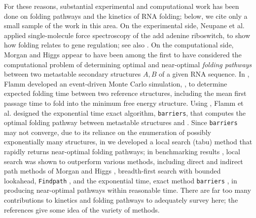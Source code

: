 For these reasons, substantial experimental and computational work
has been done on folding pathways and the kinetics of RNA folding;
below, we cite only a small sample of the work in this area.
On the experimental side,
Neupane et al. \cite{Neupane.nar11} applied single-molecule force spectroscopy
of the add adenine riboswitch, to show how folding  relates to
gene regulation;
see also \cite{Woodside.cocb08,Baird.jacs10,Mitra.r11}.
%
On the computational side, Morgan and Higgs \cite{morganHiggsBarrier}
appear to have been among the first
to have considered the computational problem of determining optimal and
near-optimal {\em folding pathways} between two metastable secondary
structures $A,B$ of a given RNA sequence.  In \cite{flammPhD}, Flamm
developed an event-driven Monte Carlo simulation, \kinfold,
to determine expected
folding time between two reference structures, including the mean first
passage time to fold into the minimum free energy structure.
Using \rnasub  \cite{Wuchty.b99}, Flamm et al.
\cite{flamm} designed the exponential
time exact algorithm, {\tt barriers}, that computes the optimal folding
pathway between metastable structures \strA and \strB. Since {\tt barriers}
may not converge, due to its reliance on the enumeration of possibly
exponentially many structures, in \cite{Dotu.nar10} we developed a
local search (tabu) method that rapidly returns near-optimal folding
pathways; in benchmarking results \cite{Dotu.nar10}, local search was shown
to outperform various methods, including direct and indirect path methods
of Morgan and Higgs \cite{morganHiggsBarrier}, breadth-first search with
bounded lookahead, {\tt Findpath} \cite{Flamm.r01}, and the
exponential time, exact method {\tt barriers} \cite{flamm}, in producing
near-optimal pathways within
reasonable time.
There are far too many contributions to kinetics and folding pathways
to adequately survey here; the references
\cite{Xayaphoummine.nar05,Tang.jmb08,Geis.jmb08,Zhao.bj10,Li.bb12}
give some idea of the variety of methods.

